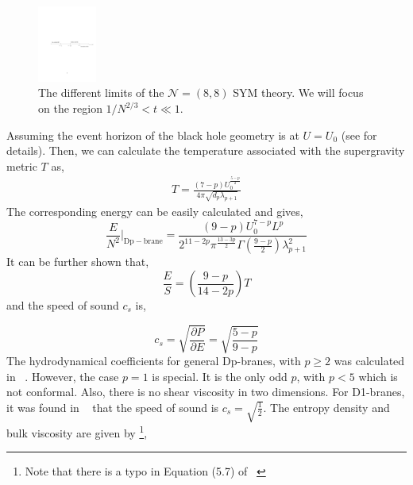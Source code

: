 \begin{figure}[htbp]
  \centering
      \includegraphics[height=2.51cm]{./Figures/limit.pdf}
  \caption{The different limits of the $\mathcal{N} = (8,8)$ SYM theory. We will focus on the region $1/N^{2/3} < t \ll 1$.}
  \label{fig:regime}
  \end{figure}
Assuming the event horizon of the black hole geometry is at $ U = U_{0}$ (see \cite{Itzhaki:1998dd,Wiseman:2013cda} for details).
Then, we can calculate the temperature associated with the supergravity metric $T$ as,  
\begin{align}\label{eq:temp} 
T = \frac{(7-p) U_{0}^{\frac{5-p}{2}}}{4\pi \sqrt{d_{p} \lambda_{p+1}}}
\end{align}
The corresponding energy can be easily calculated and gives,  
\begin{equation}\label{eq:Energy}
\frac{E}{N^{2}}\Big|_{\mathrm{Dp-brane}} = \frac{(9-p)U_{0}^{7-p} L^{p}}{2^{11-2p} \pi^{\frac{13-3p}{2}} \Gamma\left(\frac{9-p}{2}\right) \lambda_{p+1}^{2}}  
\end{equation}
It can be further shown that, 
\begin{equation}
\frac{E}{S} = \left(\frac{9-p}{14-2p}\right) T 
\end{equation}
and the speed of sound $c_{s}$ is, 

\begin{equation}
c_{s} = \sqrt{\frac{\partial P}{\partial E}} = \sqrt{\frac{5-p}{9-p}} 
\end{equation}
The hydrodynamical coefficients for general Dp-branes, with $p \ge 2$ was calculated in  ~\cite{Mas:2007ng}. 
However, the case $p=1$ is special. It is the only odd $p$, with $p  < 5$ which is not conformal. Also, there is no shear 
viscosity in two dimensions. For D1-branes, it was found in ~\cite{David:2009np} that the speed of sound is 
$c_{s} = \sqrt{\frac{1}{2}}$. The entropy density and bulk viscosity are given by \footnote{Note that there is a typo in 
Equation (5.7) of ~\cite{David:2009np}},  

